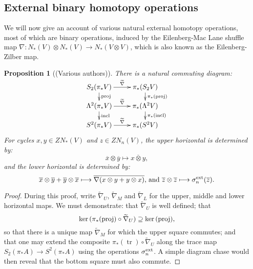 \documentclass[11pt]{amsart} \renewcommand{\baselinestretch}{1.2}
\theoremstyle{plain}
\newtheorem{prop}[thm]{Proposition}
\theoremstyle{definition}
\renewcommand{\ker}{\mathrm{ker}\,}
\DeclareMathOperator{\trace}{tr}
\renewcommand{\to}{\longrightarrow}
\newcommand{\calV}{\mathcal{V}}
\newcommand{\vect}[2]{\calV^{#1}_{#2}}
\renewcommand{\mapsto}{\longmapsto}
\begin{document}
\begin{Constructing homotopy operations}
\subsection{External binary homotopy operations}\label{External binary homotopy operations}
We will now give an account of various natural external homotopy operations, most of which are binary operations, induced by the  Eilenberg-Mac Lane shuffle map $\nabla:N_*(V)\otimes N_*(V)\to N_*(V\otimes V)$, which is also known as the Eilenberg-Zilber map.
\begin{prop}[(Various authors)]
\label{the top external homotopy operations}
There is a natural commuting diagram:
\[\xymatrix@R=4mm{
S_2(\pi_*V)\ar[r]^-{\smash{\widetilde{\nabla}}}
\ar[d]^-{\textup{proj}}
&%
\pi_*(S_2V)\ar[d]^-{\pi_*(\textup{proj})}
\\%
\Lambda^2(\pi_*V)\ar[r]^-{\widetilde{\nabla}}
\ar[d]^-{\textup{incl}}
&%
\pi_*(\Lambda^2V)\ar[d]^-{\pi_*(\textup{incl})}
\\%
S^2(\pi_*V)\ar[r]^-{\widetilde{\nabla}}&%
\pi_*(S^2V)%
}\]
For cycles $x,y\in ZN_*(V)$ and $z\in ZN_n(V)$, the upper horizontal is determined by:
\[\overline{x}\otimes\overline{y}\mapsto \overline{x\otimes y},\]
and the lower horizontal is determined by:
\[\overline{x}\otimes\overline{y}+\overline{y}\otimes \overline{x}\mapsto\overline{\nabla(x\otimes y+y\otimes x)}\textup{, and }\overline{z}\otimes\overline{z}\mapsto\sigma^\textup{ext}_n(\overline{z}).\]
\end{prop}
\begin{proof}
During this proof, write $\widetilde{\nabla}_U$, $\widetilde{\nabla}_M$ and $\widetilde{\nabla}_L$ for the upper, middle and lower horizontal maps. We must demonstrate: that $\widetilde{\nabla}_U$  is well defined; that
\[\ker(\pi_*(\textup{proj})\circ\widetilde{\nabla}_U)\supseteq\ker(\textup{proj}),\]
so that there is a unique map $\widetilde{\nabla}_M$ for which the upper square commutes; and that one may extend the composite $\pi_*(\trace)\circ\widetilde{\nabla}_U$ along the trace map $S_2(\pi_*A)\to S^2(\pi_*A)$ using the operations
$\sigma_n^\textup{ext}$.
A simple diagram chase would then reveal that the bottom square must also commute.


\end{proof}
\end{Constructing homotopy operations}
\end{document}
